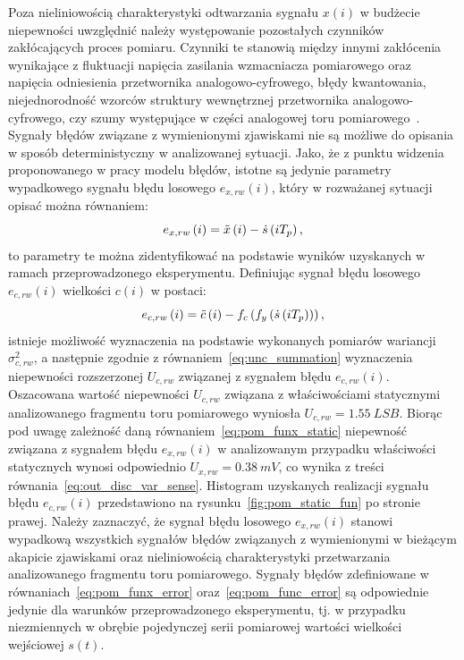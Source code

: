 Poza nieliniowością charakterystyki odtwarzania sygnału $x(i)$ w budżecie niepewności uwzględnić należy występowanie pozostałych czynników zakłócających proces pomiaru. Czynniki te stanowią między innymi zakłócenia wynikające z fluktuacji napięcia zasilania wzmacniacza pomiarowego oraz napięcia odniesienia przetwornika analogowo-cyfrowego, błędy kwantowania, niejednorodność wzorców struktury wewnętrznej przetwornika analogowo-cyfrowego, czy szumy występujące w części analogowej toru pomiarowego~\cite{stm_adc}. Sygnały błędów związane z wymienionymi zjawiskami nie są możliwe do opisania w sposób deterministyczny w analizowanej sytuacji. Jako, że z punktu widzenia proponowanego w pracy modelu błędów, istotne są jedynie parametry wypadkowego sygnału błędu losowego $e_{x,rw}(i)$, który w rozważanej sytuacji opisać można równaniem:
\begin{equation}
e_{x,rw} \left(i\right) = \tilde{x} \left(i\right) - \dot{s} \left(iT_{p}\right) \label{eq:pom_funx_error},
\end{equation}
to parametry te można zidentyfikować na podstawie wyników uzyskanych w ramach przeprowadzonego eksperymentu. Definiując sygnał błędu losowego $e_{c,rw}(i)$ wielkości $c(i)$ w postaci:
\begin{equation}
e_{c,rw} \left(i\right) = \tilde{c} \left(i\right) - f_{c} \left(f_{y} \left(\dot{s} \left(iT_{p}\right)\right)\right) \label{eq:pom_func_error},
\end{equation}
istnieje możliwość wyznaczenia na podstawie wykonanych pomiarów wariancji $\sigma_{c,rw}^{2}$, a następnie zgodnie z równaniem~\eqref{eq:unc_summation} wyznaczenia niepewności rozszerzonej $U_{c,rw}$ związanej z sygnałem błędu $e_{c,rw}(i)$. Oszacowana wartość niepewności $U_{c,rw}$ związana z właściwościami statycznymi analizowanego fragmentu toru pomiarowego wyniosła $U_{c,rw} = \qty{1.55}{LSB}$. Biorąc pod uwagę zależność daną równaniem~\eqref{eq:pom_funx_static} niepewność związana z sygnałem błędu $e_{x,rw}(i)$ w analizowanym przypadku właściwości statycznych wynosi odpowiednio $U_{x,rw} = \qty{0.38}{mV}$, co wynika z treści równania~\eqref{eq:out_disc_var_sense}. Histogram uzyskanych realizacji sygnału błędu $e_{c,rw}(i)$ przedstawiono na rysunku~\ref{fig:pom_static_fun} po stronie prawej. Należy zaznaczyć, że sygnał błędu losowego $e_{x,rw}(i)$ stanowi wypadkową wszystkich sygnałów błędów związanych z wymienionymi w bieżącym akapicie zjawiskami oraz nieliniowością charakterystyki przetwarzania analizowanego fragmentu toru pomiarowego. Sygnały błędów zdefiniowane w równaniach~\eqref{eq:pom_funx_error} oraz~\eqref{eq:pom_func_error} są odpowiednie jedynie dla warunków przeprowadzonego eksperymentu, tj. w przypadku niezmiennych w obrębie pojedynczej serii pomiarowej wartości wielkości wejściowej $s(t)$.

